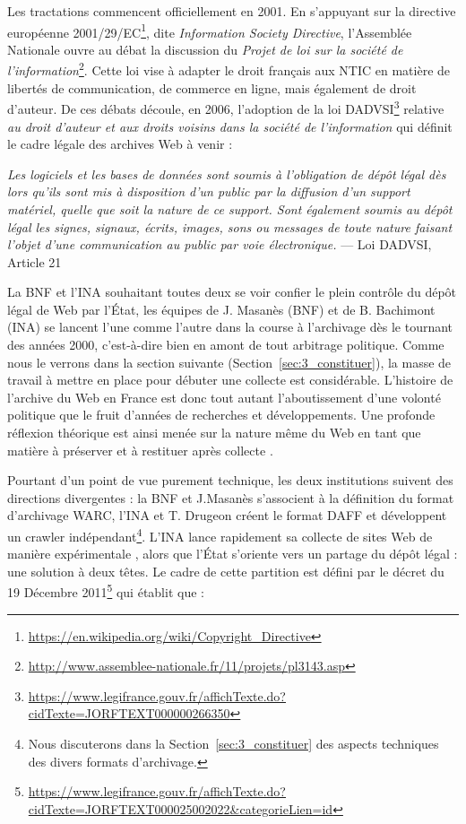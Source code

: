 \documentclass[symmetric,justified,marginals=raggedouter]{tufte-book}
\begin{document}
Les tractations commencent officiellement en 2001. En s'appuyant sur la directive européenne 2001/29/EC\footnote{\RaggedOuter \url{https://en.wikipedia.org/wiki/Copyright\_Directive}}, dite \textit{Information Society Directive}, l'Assemblée Nationale ouvre au débat la discussion du \textit{Projet de loi sur la société de l'information}\footnote{\RaggedOuter \url{http://www.assemblee-nationale.fr/11/projets/pl3143.asp}}. Cette loi vise à adapter le droit français aux NTIC en matière de libertés de communication, de commerce en ligne, mais également de droit d'auteur. De ces débats découle, en 2006, l'adoption de la loi DADVSI\footnote{\RaggedOuter \url{https://www.legifrance.gouv.fr/affichTexte.do?cidTexte=JORFTEXT000000266350}} relative \textit{au droit d'auteur et aux droits voisins dans la société de l'information} qui définit le cadre légale des archives Web à venir :\\

\begin{fullwidth}

\og\textit{Les logiciels et les bases de données sont soumis à l’obligation de dépôt légal dès lors qu’ils sont mis à disposition d’un public par la diffusion d’un support matériel, quelle que soit la nature de ce support. Sont également soumis au dépôt légal les signes, signaux, écrits, images, sons ou messages de toute nature faisant l’objet d’une communication au public par voie électronique.}\fg{} --- Loi DADVSI, Article 21\\

\end{fullwidth}

\noindent La BNF et l'INA souhaitant toutes deux se voir confier le plein contrôle du dépôt légal de Web par l'État, les équipes de J. Masanès (BNF) et de B. Bachimont (INA) se lancent l'une comme l'autre dans la course à l'archivage dès le tournant des années 2000, c'est-à-dire bien en amont de tout arbitrage politique. Comme nous le verrons dans la section suivante (Section~\ref{sec:3_constituer}), la masse de travail à mettre en place pour débuter une collecte est considérable. L'histoire de l'archive du Web en France est donc tout autant l'aboutissement d'une volonté politique que le fruit d'années de recherches et développements. Une profonde réflexion théorique est ainsi menée sur la nature même du Web en tant que matière à préserver et à restituer après collecte \citep{bachimont_archivage_2009}. 

Pourtant d'un point de vue purement technique, les deux institutions suivent des directions divergentes : la BNF et J.Masanès s'associent à la définition du format d'archivage WARC, l'INA et T. Drugeon créent le format DAFF et développent un crawler indépendant\footnote{\RaggedOuter Nous discuterons dans la Section~\ref{sec:3_constituer} des aspects techniques des divers formats d'archivage.}. L'INA lance rapidement sa collecte de sites Web de manière expérimentale \citep{bachimont_documenter_2005}, alors que l'État s'oriente vers un partage du dépôt légal : une solution à deux têtes. Le cadre de cette partition est défini par le décret du 19 Décembre 2011\footnote{\RaggedOuter \url{https://www.legifrance.gouv.fr/affichTexte.do?cidTexte=JORFTEXT000025002022&categorieLien=id}} qui établit que :
\end{document}
